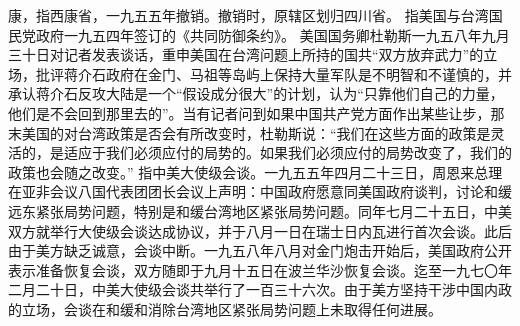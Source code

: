 \begin{maonote}
康，指西康省，一九五五年撤销。撤销时，原辖区划归四川省。
指美国与台湾国民党政府一九五四年签订的《共同防御条约》。
美国国务卿杜勒斯一九五八年九月三十日对记者发表谈话，重申美国在台湾问题上所持的国共“双方放弃武力”的立场，批评蒋介石政府在金门、马祖等岛屿上保持大量军队是不明智和不谨慎的，并承认蒋介石反攻大陆是一个“假设成分很大”的计划，认为“只靠他们自己的力量，他们是不会回到那里去的”。当有记者问到如果中国共产党方面作出某些让步，那末美国的对台湾政策是否会有所改变时，杜勒斯说：“我们在这些方面的政策是灵活的，是适应于我们必须应付的局势的。如果我们必须应付的局势改变了，我们的政策也会随之改变。”
指中美大使级会谈。一九五五年四月二十三日，周恩来总理在亚非会议八国代表团团长会议上声明：中国政府愿意同美国政府谈判，讨论和缓远东紧张局势问题，特别是和缓台湾地区紧张局势问题。同年七月二十五日，中美双方就举行大使级会谈达成协议，并于八月一日在瑞士日内瓦进行首次会谈。此后由于美方缺乏诚意，会谈中断。一九五八年八月对金门炮击开始后，美国政府公开表示准备恢复会谈，双方随即于九月十五日在波兰华沙恢复会谈。迄至一九七〇年二月二十日，中美大使级会谈共举行了一百三十六次。由于美方坚持干涉中国内政的立场，会谈在和缓和消除台湾地区紧张局势问题上未取得任何进展。
\end{maonote}
